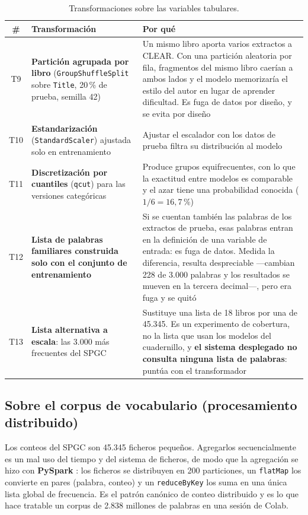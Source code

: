 \documentclass[11pt,a4paper]{article}
\newcommand{\cod}[1]{\texttt{\small #1}}
\newcommand{\pct}{\,\%}
\begin{document}
\begin{table}[htbp]
\centering
\small
\begin{tabularx}{\textwidth}{@{}c L{4.6cm} Y@{}}
\toprule
\textbf{\#} & \textbf{Transformación} & \textbf{Por qué} \\
\midrule
T9 & \textbf{Partición agrupada por libro} (\cod{GroupShuffleSplit} sobre \cod{Title}, 20\pct{} de prueba, semilla 42) & Un mismo libro aporta varios extractos a CLEAR. Con una partición aleatoria por fila, fragmentos del mismo libro caerían a ambos lados y el modelo memorizaría el estilo del autor en lugar de aprender dificultad. Es fuga de datos por diseño, y se evita por diseño \\
\addlinespace
T10 & \textbf{Estandarización} (\cod{StandardScaler}) ajustada solo en entrenamiento & Ajustar el escalador con los datos de prueba filtra su distribución al modelo \\
\addlinespace
T11 & \textbf{Discretización por cuantiles} (\cod{qcut}) para las versiones categóricas & Produce grupos equifrecuentes, con lo que la exactitud entre modelos es comparable y el azar tiene una probabilidad conocida ($1/6 = 16{,}7\pct$) \\
\addlinespace
T12 & \textbf{Lista de palabras familiares construida solo con el conjunto de entrenamiento} & Si se cuentan también las palabras de los extractos de prueba, esas palabras entran en la definición de una variable de entrada: es fuga de datos. Medida la diferencia, resulta despreciable —cambian 228 de 3.000 palabras y los resultados se mueven en la tercera decimal—, pero era fuga y se quitó \\
T13 & \textbf{Lista alternativa a escala}: las 3.000 más frecuentes del SPGC & Sustituye una lista de 18 libros por una de 45.345. Es un experimento de cobertura, no la lista que usan los modelos del cuadernillo, y \textbf{el sistema desplegado no consulta ninguna lista de palabras}: puntúa con el transformador \\
\bottomrule
\end{tabularx}
\caption{Transformaciones sobre las variables tabulares.}
\label{cuad:tabulares}
\end{table}

\subsection{Sobre el corpus de vocabulario (procesamiento distribuido)}

Los conteos del SPGC son 45.345 ficheros pequeños. Agregarlos secuencialmente es un mal
uso del tiempo y del sistema de ficheros, de modo que la agregación se hizo con
\textbf{PySpark} \parencite{zaharia2016spark}: los ficheros se distribuyen en 200
particiones, un \cod{flatMap} los convierte en pares (palabra, conteo) y un
\cod{reduceByKey} los suma en una única lista global de frecuencia. Es el patrón canónico
de conteo distribuido y es lo que hace tratable un corpus de 2.838 millones de palabras
en una sesión de Colab.
\end{document}
